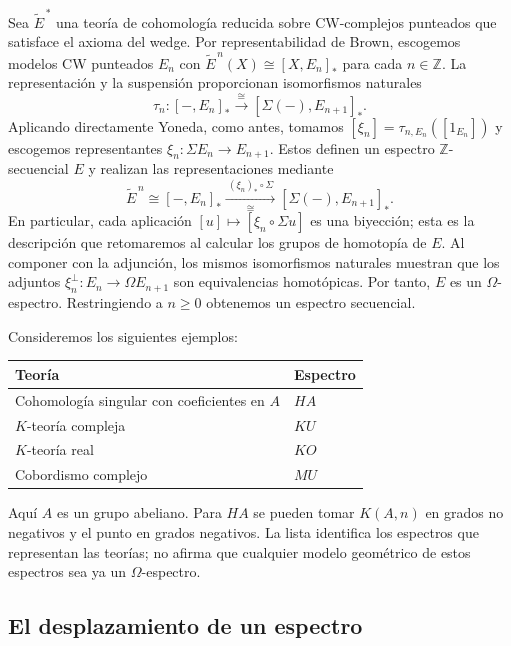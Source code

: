 \begin{ejem}\label{ejem:espcoho}
Sea $\widetilde E^{\,*}$ una teoría de cohomología reducida sobre CW-complejos punteados que satisface el axioma del wedge. Por representabilidad de Brown, escogemos modelos CW punteados $E_n$ con $\widetilde E^{\,n}(X)\cong[X,E_n]_*$ para cada $n\in\mathbb Z$. La representación y la suspensión proporcionan isomorfismos naturales
\[
\tau_n\colon[-,E_n]_*\xrightarrow{\ \cong\ }[\Sigma(-),E_{n+1}]_*.
\]
Aplicando directamente Yoneda, como antes, tomamos $[\xi_n]=\tau_{n,E_n}([1_{E_n}])$ y escogemos representantes $\xi_n\colon\Sigma E_n\to E_{n+1}$. Estos definen un espectro $\mathbb Z$-secuencial $E$ y realizan las representaciones mediante
\[
\widetilde E^{\,n}\cong[-,E_n]_*
\xrightarrow[\cong]{\ (\xi_n)_*\circ\Sigma\ }
[\Sigma(-),E_{n+1}]_*.
\]
En particular, cada aplicación $[u]\mapsto[\xi_n\circ\Sigma u]$ es una biyección; esta es la descripción que retomaremos al calcular los grupos de homotopía de $E$. Al componer con la adjunción, los mismos isomorfismos naturales muestran que los adjuntos $\xi_n^\perp\colon E_n\to\Omega E_{n+1}$ son equivalencias homotópicas. Por tanto, $E$ es un $\Omega$-espectro. Restringiendo a $n\ge0$ obtenemos un espectro secuencial.

Consideremos los siguientes ejemplos:
\begin{center}
\begin{tabular}{ll}
\hline
Teoría & Espectro\\
\hline
Cohomología singular con coeficientes en $A$ & $HA$\\
$K$-teoría compleja & $KU$\\
$K$-teoría real & $KO$\\
Cobordismo complejo & $MU$\\
\hline
\end{tabular}
\end{center}
Aquí $A$ es un grupo abeliano. Para $HA$ se pueden tomar $K(A,n)$ en grados no negativos y el punto en grados negativos. La lista identifica los espectros que representan las teorías; no afirma que cualquier modelo geométrico de estos espectros sea ya un $\Omega$-espectro.
\end{ejem}

\subsection{El desplazamiento de un espectro}

